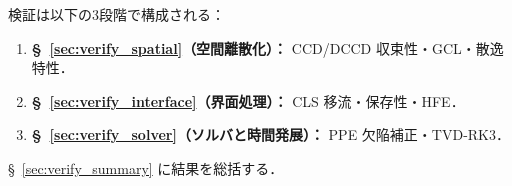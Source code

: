 検証は以下の3段階で構成される：
\begin{enumerate}
  \item \textbf{§~\ref{sec:verify_spatial}（空間離散化）：}
        CCD/DCCD 収束性・GCL・散逸特性．
  \item \textbf{§~\ref{sec:verify_interface}（界面処理）：}
        CLS 移流・保存性・HFE．
  \item \textbf{§~\ref{sec:verify_solver}（ソルバと時間発展）：}
        PPE 欠陥補正・TVD-RK3．
\end{enumerate}
§~\ref{sec:verify_summary} に結果を総括する．


